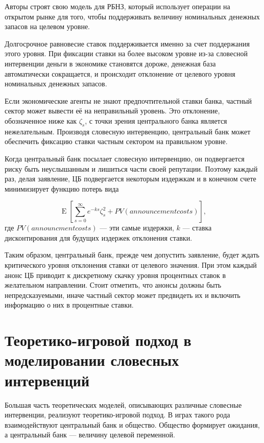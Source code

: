 \documentclass[14pt,a4paper, oneside]{extreport}
\DeclareMathOperator{\E}{\mathop{E}}
\theoremstyle{plain}              %
\theoremstyle{definition}         %
\begin{document}
Авторы строят свою модель для РБНЗ, который использует операции на открытом рынке для того, чтобы поддерживать величину номинальных денежных запасов на целевом уровне. 

Долгосрочное равновесие ставок поддерживается именно за счет поддержания этого уровня. При фиксации ставки на более высоком уровне из-за словесной интервенции деньги в экономике становятся дороже, денежная база автоматически сокращается, и происходит отклонение от целевого уровня номинальных денежных запасов.

Если экономические агенты не знают предпочтительной ставки банка, частный сектор может вывести её на неправильный уровень. Это отклонение, обозначенное ниже как  $\zeta_s$, с точки зрения центрального банка является нежелательным. Производя словесную интервенцию, центральный банк может обеспечить фиксацию ставки частным сектором на правильном уровне. 

Когда центральный банк посылает словесную интервенцию, он подвергается риску быть неуслышанным и лишиться части своей репутации. Поэтому каждый раз, делая заявление, ЦБ подвергается некоторым издержкам и в конечном счете минимизирует функцию потерь вида

\begin{equation}
\E \left[ \sum_{s=0}^{\infty} e^{-ks} \zeta_s^2 + PV(announcement costs) \right],
\end{equation} где  $PV(announcment costs)$ --- эти самые издержки, $k$ --- ставка дисконтирования для будущих издержек отклонения ставки.

Таким образом, центральный банк, прежде чем допустить заявление, будет ждать критического уровня отклонения ставки от целевого значения. При этом каждый анонс ЦБ приводит к дискретному скачку уровня процентных ставок в желательном направлении. Стоит отметить, что анонсы должны быть непредсказуемыми, иначе частный сектор может предвидеть их и включить информацию о них в процентные ставки.

\section{Теоретико-игровой подход в моделировании словесных интервенций}

Большая часть теоретических моделей, описывающих различные словесные интервенции, реализуют теоретико-игровой подход. В играх такого рода взаимодействуют центральный банк и общество. Общество формирует ожидания, а центральный банк --- величину целевой переменной.
\end{document}
